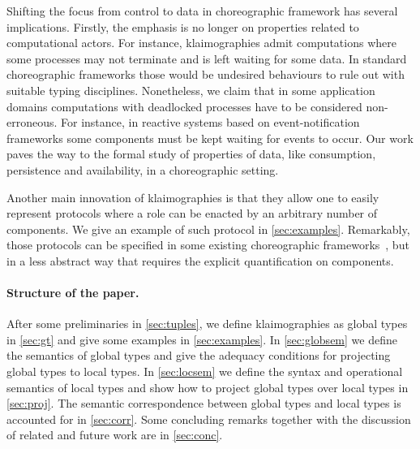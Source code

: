 Shifting the focus from control to data in choreographic framework has
several implications.
%
Firstly, the emphasis is no longer on properties related to
computational actors.
%
For instance, klaimographies admit computations where some processes
may not terminate and is left waiting for some data.
%
In standard choreographic frameworks those would be undesired behaviours
to rule out with suitable typing disciplines.
%
Nonetheless, we claim that in some application domains computations with
deadlocked processes have to be considered non-erroneous.
%
For instance, in reactive systems based on event-notification
frameworks some  components must be kept waiting for
events to occur.
%
Our work paves the way to the formal study of properties of data, like consumption, persistence and availability, in a choreographic setting.

Another main innovation of klaimographies is that they allow one to
easily represent protocols where a role can be enacted by an arbitrary
number of components.
%
We give an example of such protocol in \cref{sec:examples}.
%
Remarkably, those protocols can be specified in some existing
choreographic frameworks~\cite{ydbh10,chjny19}, but in a less abstract way
that requires the explicit quantification on components.

\paragraph{Structure of the paper.}
 After some preliminaries in \cref{sec:tuples}, we
define klaimographies as global types in \cref{sec:gt} and give some
examples in \cref{sec:examples}.  In \cref{sec:globsem} we define the
semantics of global types and give the adequacy conditions for
projecting global types to local types.  In \cref{sec:locsem} we
define the syntax and operational semantics of local types and show
how to project global types over local types in \cref{sec:proj}.  The
semantic correspondence between global types and local types is
accounted for in \cref{sec:corr}.  Some concluding remarks together
with the discussion of related and future work are in \cref{sec:conc}.


